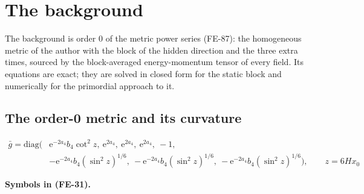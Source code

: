 \documentclass[
  10pt,
]{article}
\begin{document}
\hypertarget{the-background}{%
\section{The background}\label{the-background}}

The background is order 0 of the metric power series (FE-87): the
homogeneous metric of the author with the block of the hidden direction
and the three extra times, sourced by the block-averaged energy-momentum
tensor of every field. Its equations are exact; they are solved in
closed form for the static block and numerically for the primordial
approach to it.

\hypertarget{the-order-0-metric-and-its-curvature}{%
\subsection{The order-0 metric and its
curvature}\label{the-order-0-metric-and-its-curvature}}

\[
\begin{aligned}
\bar g = \mathrm{diag}\Big(&\mathrm{e}^{-2a_4}b_4\cot^2z,\ \mathrm{e}^{2a_4},\ \mathrm{e}^{2a_4},\ 
 \mathrm{e}^{2a_4},\ -1,\\
&-\mathrm{e}^{-2a_4}b_4(\sin^2z)^{1/6},\ -\mathrm{e}^{-2a_4}b_4(\sin^2z)^{1/6},\ -\mathrm{e}^{-2a_4}b_4(
 \sin^2z)^{1/6}\Big),
 \qquad z = 6Hx_0
\end{aligned} \tag{FE-31}
\]

\textbf{Symbols in (FE-31).}
\end{document}
